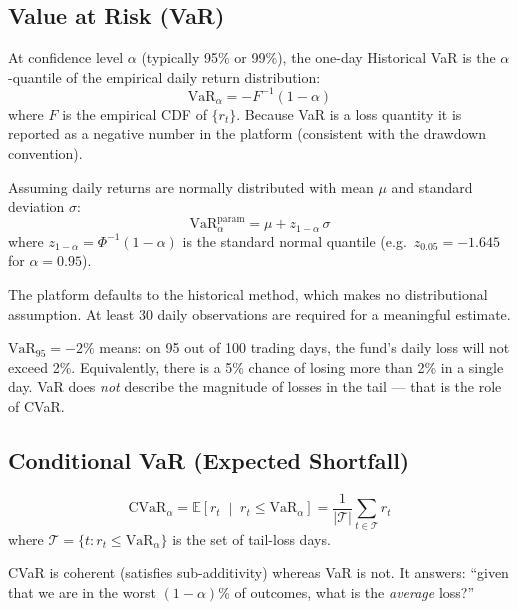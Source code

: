 \documentclass[12pt, a4paper]{article}
\newcommand{\E}{\mathbb{E}}
\begin{document}
\subsection{Value at Risk (VaR)}

\begin{definition}
At confidence level $\alpha$ (typically 95\% or 99\%), the one-day
Historical VaR is the $\alpha$-quantile of the empirical daily return
distribution:
\[
  \mathrm{VaR}_\alpha = -F^{-1}(1 - \alpha)
\]
where $F$ is the empirical CDF of $\{r_t\}$.  Because VaR is a loss
quantity it is reported as a negative number in the platform (consistent
with the drawdown convention).
\end{definition}

\begin{definition}
Assuming daily returns are normally distributed with mean $\mu$ and
standard deviation $\sigma$:
\[
  \mathrm{VaR}_\alpha^{\text{param}} = \mu + z_{1-\alpha}\,\sigma
\]
where $z_{1-\alpha} = \Phi^{-1}(1-\alpha)$ is the standard normal quantile
(e.g.\ $z_{0.05} = -1.645$ for $\alpha = 0.95$).
\end{definition}

The platform defaults to the historical method, which makes no distributional
assumption.  At least 30 daily observations are required for a meaningful
estimate.

\begin{interpretation}[VaR]
$\mathrm{VaR}_{95} = -2\%$ means: on 95 out of 100 trading days, the fund's
daily loss will not exceed 2\%.  Equivalently, there is a 5\% chance of
losing more than 2\% in a single day.  VaR does \emph{not} describe the
magnitude of losses in the tail — that is the role of CVaR.
\end{interpretation}

\subsection{Conditional VaR (Expected Shortfall)}

\begin{definition}
\[
  \mathrm{CVaR}_\alpha = \E\!\left[r_t \;\middle|\; r_t \leq \mathrm{VaR}_\alpha\right]
  = \frac{1}{|\mathcal{T}|}\sum_{t \in \mathcal{T}} r_t
\]
where $\mathcal{T} = \{t : r_t \leq \mathrm{VaR}_\alpha\}$ is the set of
tail-loss days.
\end{definition}

CVaR is coherent (satisfies sub-additivity) whereas VaR is not.  It
answers: ``given that we are in the worst $(1-\alpha)$\% of outcomes, what
is the \emph{average} loss?''
\end{document}
